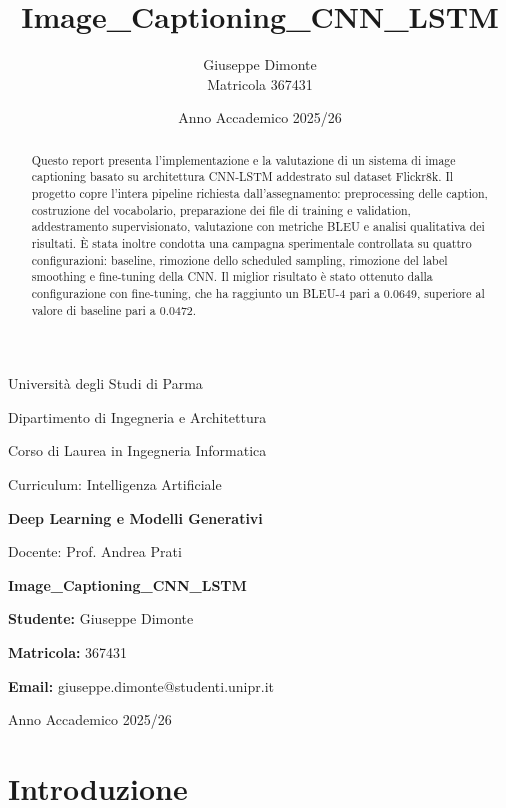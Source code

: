 \documentclass[11pt,a4paper]{article}
\title{Image\_Captioning\_CNN\_LSTM}
\author{Giuseppe Dimonte \\ Matricola 367431}
\date{Anno Accademico 2025/26}
\begin{document}
\begin{titlepage}
\centering
{\Large Università degli Studi di Parma \par}
\vspace{0.3cm}
{\large Dipartimento di Ingegneria e Architettura \par}
\vspace{0.3cm}
{\large Corso di Laurea in Ingegneria Informatica \par}
{\large Curriculum: Intelligenza Artificiale \par}
\vspace{1.2cm}
{\Large \textbf{Deep Learning e Modelli Generativi} \par}
\vspace{0.5cm}
{\large Docente: Prof. Andrea Prati \par}
\vspace{1.5cm}
{\huge \textbf{Image\_Captioning\_CNN\_LSTM} \par}
\vspace{1.5cm}
{\large \textbf{Studente:} Giuseppe Dimonte \par}
{\large \textbf{Matricola:} 367431 \par}
{\large \textbf{Email:} giuseppe.dimonte@studenti.unipr.it \par}
\vfill
{\large Anno Accademico 2025/26 \par}
\end{titlepage}

\tableofcontents
\newpage

\begin{abstract}
Questo report presenta l'implementazione e la valutazione di un sistema di image captioning basato su architettura CNN-LSTM addestrato sul dataset Flickr8k. Il progetto copre l'intera pipeline richiesta dall'assegnamento: preprocessing delle caption, costruzione del vocabolario, preparazione dei file di training e validation, addestramento supervisionato, valutazione con metriche BLEU e analisi qualitativa dei risultati. È stata inoltre condotta una campagna sperimentale controllata su quattro configurazioni: baseline, rimozione dello scheduled sampling, rimozione del label smoothing e fine-tuning della CNN. Il miglior risultato è stato ottenuto dalla configurazione con fine-tuning, che ha raggiunto un BLEU-4 pari a 0.0649, superiore al valore di baseline pari a 0.0472.
\end{abstract}

\section{Introduzione}
\end{document}
